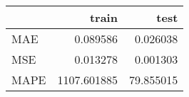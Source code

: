 \begin{tabular}{lrr}
\toprule
{} &        train &       test \\
\midrule
MAE  &     0.089586 &   0.026038 \\
MSE  &     0.013278 &   0.001303 \\
MAPE &  1107.601885 &  79.855015 \\
\bottomrule
\end{tabular}
